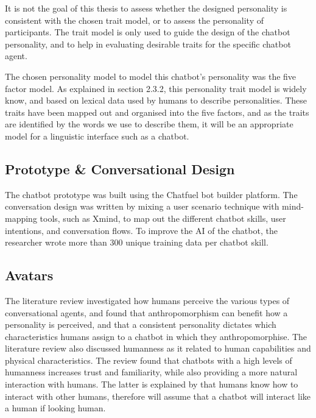     It is not the goal of this thesis to assess whether the designed personality is consistent with the chosen trait model, or to assess the personality of participants. The trait model is only used to guide the design of the chatbot personality, and to help in evaluating desirable traits for the specific chatbot agent. 
    
    The chosen personality model to model this chatbot's personality was the five factor model. As explained in section 2.3.2, this personality trait model is widely know, and based on lexical data used by humans to describe personalities. These traits have been mapped out and organised into the five factors, and as the traits are identified by the words we use to describe them, it will be an appropriate model for a linguistic interface such as a chatbot.
    
\vspace{5mm}

        \subsection{Prototype \& Conversational Design}
        The chatbot prototype was built using the Chatfuel bot builder platform. The conversation design was written by mixing a user scenario technique with mind-mapping tools, such as Xmind, to map out the different chatbot skills, user intentions, and conversation flows. To improve the AI of the chatbot, the researcher wrote more than 300 unique training data per chatbot skill.
        
\vspace{5mm}

        \subsection{Avatars}
        The literature review investigated how humans perceive the various types of conversational agents, and found that anthropomorphism can benefit how a personality is perceived, and that a consistent personality dictates which characteristics humans assign to a chatbot in which they anthropomorphise. The literature review also discussed humanness as it related to human capabilities and physical characteristics. The review found that chatbots with a high levels of humanness increases trust and familiarity, while also providing a more natural interaction with humans. The latter is explained by that humans know how to interact with other humans, therefore will assume that a chatbot will interact like a human if looking human. 
        
